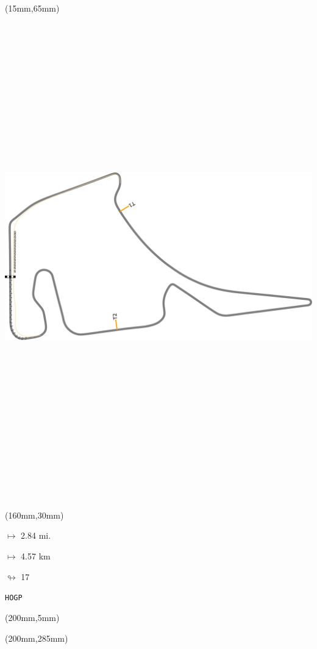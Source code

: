 \begin{textblock*}{185mm}(15mm,65mm)%
\centering
\mbox{\includegraphics[width=185mm,height=210mm,keepaspectratio]{PT/HOGP.pdf}}
\end{textblock*}
\begin{textblock*}{40mm}(160mm,30mm)%
\Large
\par$\mapsto$ 2.84 mi.
\par$\mapsto$ 4.57 km
\par$\looparrowright$ 17
\par\hfill\tiny\tt HOGP\\
\end{textblock*}
\begin{textblock*}{20mm}(200mm,5mm)%
\fbox{\thepage}
\label{HOGP}
\end{textblock*}
\begin{textblock*}{20mm}(200mm,285mm)%
\fbox{\thepage}
\end{textblock*}

